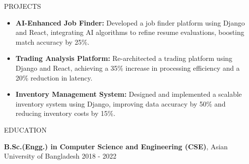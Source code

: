 \documentclass{resume} %
\begin{document}
\begin{rSection}{PROJECTS}

\begin{itemize}
    \item \textbf{AI-Enhanced Job Finder:} Developed a job finder platform using Django and React, integrating AI algorithms to refine resume evaluations, boosting match accuracy by 25\%.
    \item \textbf{Trading Analysis Platform:} Re-architected a trading platform using Django and React, achieving a 35\% increase in processing efficiency and a 20\% reduction in latency.
    \item \textbf{Inventory Management System:} Designed and implemented a scalable inventory system using Django, improving data accuracy by 50\% and reducing inventory costs by 15\%.
\end{itemize}

\end{rSection} 


\begin{rSection}{EDUCATION}

{\bf B.Sc.(Engg.) in Computer Science and Engineering (CSE)}, Asian University of Bangladesh \hfill {2018 - 2022}

\end{rSection}








\end{document}
